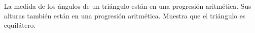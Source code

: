 La medida de los ángulos de un triángulo están en una progresión aritmética. Sus alturas también están en una progresión aritmética. Muestra que el triángulo es equilátero.